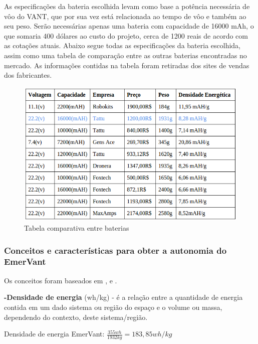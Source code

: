 As especificações da bateria escolhida levam como base a potência necessária de vôo do VANT, que por sua vez está relacionada ao tempo de vôo e também ao seu peso.  Serão necessárias apenas uma bateria com capacidade de 16000 mAh, o que somaria 400 dólares ao custo do projeto, cerca de 1200 reais de acordo com as cotações atuais. Abaixo segue todas as especificações da bateria escolhida, assim como uma tabela de comparação entre as outras baterias encontradas no mercado. 
As informações contidas na tabela foram retiradas dos sites de vendas dos fabricantes.
 \begin{figure}[h!]
    \centering
	\includegraphics[keepaspectratio=true,scale=0.7]{figuras/comparacaobaterias.png}
    \caption{Tabela comparativa entre baterias}
\end{figure}

\nocite{bateria1}
\nocite{bateria2}
\nocite{bateria3}
\nocite{bateria4}
\nocite{bateria5}
\nocite{bateria6}
\nocite{bateria7}
\nocite{bateria8}
\nocite{bateria9}
\nocite{bateria10}


\subsubsection{Conceitos e características para obter a autonomia do EmerVant}

Os conceitos foram baseados em \cite{charlesa}, \cite{charlesb} e \cite{gibbs}.

\textbf{-Densidade de energia} (wh/kg) - é a relação entre a quantidade de energia contida em um dado sistema ou região do espaço e o volume ou massa, dependendo do contexto, deste sistema/região.

	Densidade de energia EmerVant: $\frac{355wh}{1932kg} =  183,85 wh/kg$

